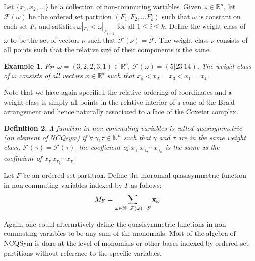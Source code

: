 \documentclass[12pt]{amsart}
\newtheorem{definition}{Definition}
\newtheorem{example}[definition]{Example}
\begin{document}


Let $\{x_1, x_2, \ldots \}$ be a collection of non-commuting
variables.  Given $\omega\in \mathbb{R}^n$, let $\mathcal{F}(\omega)$
be the ordered set partition $(F_1,F_2, \ldots F_k)$ such that 
$\omega$ is constant on each set $F_i$
and satisfies $\omega|_{F_i} < \omega|_{F_{i+1}}$ for all $1 \leq i \leq k$. 
Define the weight class of $\omega$ to be the set of vectors $\nu$
such that $\mathcal{F}(\nu) = \mathcal{F}$.  The weight class $\nu$ consists of all 
points such that the relative size of their components is the same.

\begin{example}
For $\omega = (3,2,2,3,1) \in \mathbb{R}^5$, $\mathcal{F}(\omega) =
(5|23|14)$.  The weight class of $\omega$ consists of all vectors $x
\in \mathbb{R}^5$ such that $x_5 < x_2 = x_3 < x_1 = x_4$. 
\end{example}

Note that
we have again specified the relative ordering of coordinates and a
weight class is simply all points in the relative interior of a cone
of the Braid arrangement and hence naturally associated to a face of
the Coxeter complex.


\begin{definition}
A function in non-commuting variables is called quasisymmetric (an element of NCQsym) if
$\forall \, \gamma, \tau \in \mathbb{N}^n$ such that $\gamma$ and $\tau$
are in the same weight class, $\mathcal{F}(\gamma) =
\mathcal{F}(\tau)$, the coefficient of $x_{\gamma_1}x_{\gamma_2} \cdots
x_{\gamma_n}$ is the same as the coefficient of $x_{\tau_1}x_{\tau_2} \cdots x_{\tau_n}$.
\end{definition}

Let $F$ be an ordered set partition.  Define the monomial quasisymmetric function in non-commuting variables indexed by $F$ as follows:
$$M_F = \sum_{\omega \in \mathbb{N}^n \, \mathcal{F}(\omega) = F} {\bf{x}}_{\omega}$$

Again, one could alternatively define the quasisymmetric functions in
non-commuting variables to be any sum of the monomials.  Most of the
algebra of NCQSym is done at the level of monomials or other bases
indexed by ordered set partitions without reference to the specific
variables.  
\end{document}
